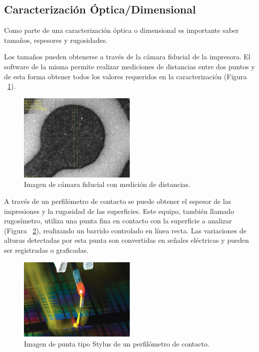 \subsection{Caracterizaci\'on \'Optica/Dimensional}
Como parte de una caracterización óptica o dimensional es importante saber tamaños, espesores y rugosidades.

Los tamaños pueden obtenerse a través de la cámara fiducial de la impresora. El software de la misma permite realizar mediciones de distancias entre dos puntos y de esta forma obtener todos los valores requeridos en la caracterización (Figura ~\ref{fig:Figura_Cam_Fiducial_Medicion}).

\begin{figure}[H]
  \centering
    \includegraphics[width=0.5\textwidth]{Figuras/Figura_Cam_Fiducial_Medicion}
  \caption{Imagen de cámara fiducial con medición de distancias.}
  \label{fig:Figura_Cam_Fiducial_Medicion}
\end{figure}

A través de un perfilómetro de contacto se puede obtener el espesor de las impresiones y la rugosidad de las superficies. Este equipo, también llamado rugosímetro, utiliza una punta fina en contacto con la superficie a analizar (Figura ~\ref{fig:Figura_Stylus}), realizando un barrido controlado en línea recta. Las variaciones de alturas detectadas por esta punta son convertidas en señales eléctricas y pueden ser registradas o graficadas.

\begin{figure}[H]
  \centering
    \includegraphics[width=0.5\textwidth]{Figuras/Figura_Stylus}
  \caption{Imagen de punta tipo Stylus de un perfilómetro de contacto.}
  \label{fig:Figura_Stylus}
\end{figure}

